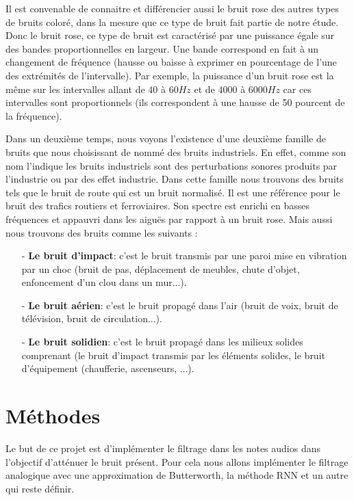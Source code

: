 \documentclass[conference,onecolumn]{IEEEtran}
\begin{document}
\begin{itemize}
    Il est convenable de connaitre et différencier aussi le bruit rose des autres types de bruits coloré, dans la mesure que ce type de bruit fait partie de notre étude. Donc le bruit rose, ce type de bruit est caractérisé par une puissance égale sur des bandes proportionnelles en largeur. Une bande correspond en fait à un changement de fréquence (hausse ou baisse à exprimer en pourcentage de l’une des extrémités de l’intervalle). Par exemple, la puissance d’un bruit rose est la même sur les intervalles allant de $40$ à $60Hz$ et de $4000$ à $6000Hz$ car ces intervalles sont proportionnels (ils correspondent à une hausse de 50 pourcent de la fréquence). 

\end{itemize}
\hfill

Dans un deuxième temps, nous voyons l’existence d’une deuxième
famille de bruits que nous choisissant de nommé des bruits
industriels. En effet, comme son nom l’indique les bruits
industriels sont des perturbations sonores produits par l’industrie
ou par des effet industrie. Dans cette famille nous trouvons des
bruits tels que le bruit de route qui est un bruit normalisé. Il est
une référence pour le bruit des trafics routiers et ferroviaires.
Son spectre est enrichi en basses fréquences et appauvri dans les
aiguës par rapport à un bruit rose. Mais aussi nous trouvons des
bruits comme les suivants :
\hfill

\begin{itemize}

    \item[-] \textbf{Le bruit d’impact}: c’est le bruit transmis par une paroi mise en vibration par un choc (bruit de pas, déplacement de meubles, chute d’objet, enfoncement d’un clou dans un mur...).
    \item[-] \textbf{Le bruit aérien}: c’est le bruit propagé dans l’air (bruit de voix, bruit de télévision, bruit de circulation...). 
    \item[-] \textbf{Le bruit solidien}: c’est le bruit propagé dans les milieux solides comprenant (le bruit d’impact transmis par les éléments solides, le bruit d’équipement (chaufferie, ascenseurs, ...). 
    
\end{itemize}

\newpage
\section{Méthodes}
Le but de ce projet est d’implémenter le filtrage dans les notes audios dans l'objectif d'atténuer le bruit présent. Pour cela nous allons implémenter le filtrage analogique avec une approximation de Butterworth, la méthode RNN et un autre qui reste définir.
\end{document}
